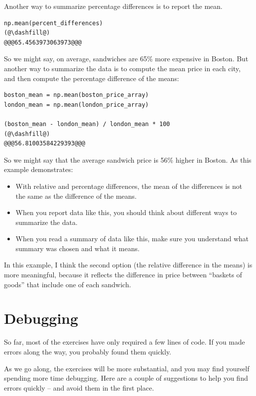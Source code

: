 Another way to summarize percentage differences is to report the mean.

\begin{lstlisting}[]
np.mean(percent_differences)
(@\dashfill@)
@@@65.4563973063973@@@
\end{lstlisting}

So we might say, on average, sandwiches are 65\% more expensive in
Boston. But another way to summarize the data is to compute the mean
price in each city, and then compute the percentage difference of the
means:

\begin{lstlisting}[]
boston_mean = np.mean(boston_price_array)
london_mean = np.mean(london_price_array)

(boston_mean - london_mean) / london_mean * 100
(@\dashfill@)
@@@56.81003584229393@@@
\end{lstlisting}

So we might say that the average sandwich price is 56\% higher in
Boston. As this example demonstrates:

\begin{itemize}
\item
  With relative and percentage differences, the mean of the differences
  is not the same as the difference of the means.
\item
  When you report data like this, you should think about different ways
  to summarize the data.
\item
  When you read a summary of data like this, make sure you understand
  what summary was chosen and what it means.
\end{itemize}

In this example, I think the second option (the relative difference in
the means) is more meaningful, because it reflects the difference in
price between ``baskets of goods'' that include one of each sandwich.

\hypertarget{debugging}{%
\section{Debugging}\label{debugging}}

So far, most of the exercises have only required a few lines of code. If
you made errors along the way, you probably found them quickly.

As we go along, the exercises will be more substantial, and you may find
yourself spending more time debugging. Here are a couple of suggestions
to help you find errors quickly -- and avoid them in the first place.

